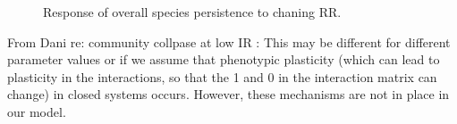 \begin{figure}
	\centering	
	\renewcommand{\thesubfigure}{}
	\setlength{\subfloatlabelskip}{0pt}
	\caption{Response of overall species persistence to chaning RR.}
	\label{fig:rr_v_species_persistence}
\end{figure}

From Dani re: community collpase at low IR : This may be different for different parameter values or if we assume that phenotypic plasticity (which can lead to plasticity in the interactions, so that the 1 and 0 in the interaction matrix can change) in closed systems occurs. However, these mechanisms are not in place in our model.